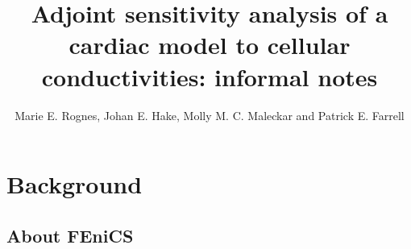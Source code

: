 \documentclass[a4paper, reqno]{amsart}
\title{Adjoint sensitivity analysis of a cardiac model to cellular
  conductivities: informal notes}
\author{Marie E. Rognes, Johan E. Hake, Molly M. C. Maleckar and
  Patrick E. Farrell}
\numberwithin{equation}{section}
\begin{document}

\maketitle

\renewcommand{\thefootnote}{\arabic{footnote}}


\section{Background}

\subsection{About FEniCS}
\end{document}

